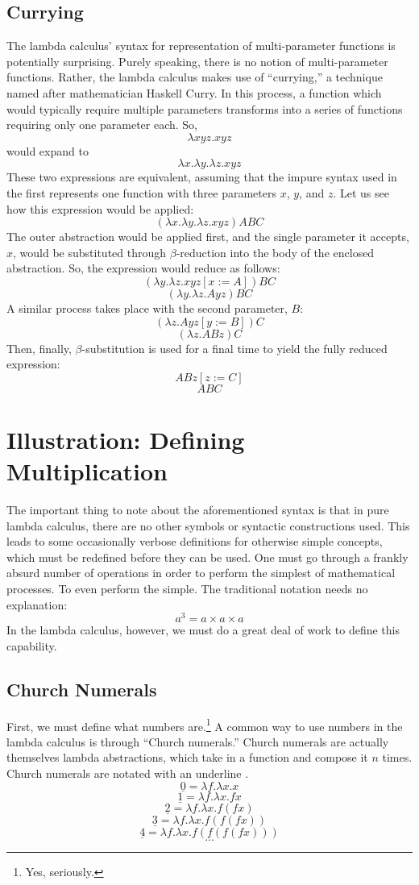 \documentclass[twocolumn,titlepage,12pt]{article}
\begin{document}
\subsection{Currying}
The lambda calculus' syntax for representation of multi-parameter functions is potentially surprising. Purely speaking, there is no notion of multi-parameter functions. Rather, the lambda calculus makes use of ``currying,'' a technique named after mathematician Haskell Curry. In this process, a function which would typically require multiple parameters transforms into a series of functions requiring only one parameter each. So,
$$\lambda xyz.xyz$$
would expand to
$$\lambda x.\lambda y.\lambda z.xyz$$
These two expressions are equivalent, assuming that the impure syntax used in the first represents one function with three parameters $x$, $y$, and $z$. Let us see how this expression would be applied:
$$(\lambda x.\lambda y.\lambda z.xyz)ABC$$
The outer abstraction would be applied first, and the single parameter it accepts, $x$, would be substituted through $\beta$-reduction into the body of the enclosed abstraction. So, the expression would reduce as follows:
$$(\lambda y.\lambda z.xyz[x:=A])BC$$
$$(\lambda y.\lambda z.Ayz)BC$$
A similar process takes place with the second parameter, $B$:
$$(\lambda z.Ayz[y:=B])C$$
$$(\lambda z.ABz)C$$
Then, finally, $\beta$-substitution is used for a final time to yield the fully reduced expression:
$$ABz[z:=C]$$
$$ABC$$

\section{Illustration: Defining Multiplication}
The important thing to note about the aforementioned syntax is that in pure lambda calculus, there are no other symbols or syntactic constructions used. This leads to some occasionally verbose definitions for otherwise simple concepts, which must be redefined before they can be used. One must go through a frankly absurd number of operations in order to perform the simplest of mathematical processes. To even perform the simple. The traditional notation needs no explanation:
$$
a^3 = a\times a\times a
$$
In the lambda calculus, however, we must do a great deal of work to define this capability.

\subsection{Church Numerals}
First, we must define what numbers are.\footnote{Yes, seriously.} A common way to use numbers in the lambda calculus is through ``Church numerals.'' Church numerals are actually themselves lambda abstractions, which take in a function and compose it $n$ times. Church numerals are notated with an underline \cite{cornelllc}.
$$\underline{0}=\lambda f.\lambda x.x$$
$$\underline{1}=\lambda f.\lambda x.fx$$
$$\underline{2}=\lambda f.\lambda x.f(fx)$$
$$\underline{3}=\lambda f.\lambda x.f(f(fx))$$
$$\underline{4}=\lambda f.\lambda x.f(f(f(fx)))$$
$$...$$
\end{document}
